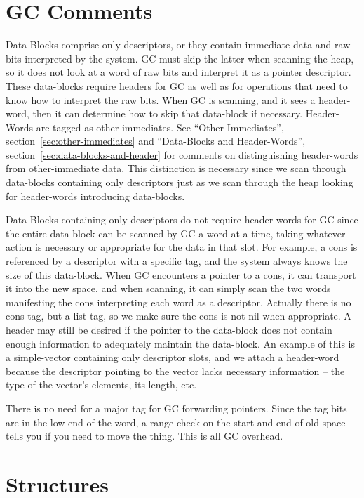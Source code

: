 
\section{GC Comments}

Data-Blocks comprise only descriptors, or they contain immediate data and raw
bits interpreted by the system.  GC must skip the latter when scanning the
heap, so it does not look at a word of raw bits and interpret it as a pointer
descriptor.  These data-blocks require headers for GC as well as for operations
that need to know how to interpret the raw bits.  When GC is scanning, and it
sees a header-word, then it can determine how to skip that data-block if
necessary.  Header-Words are tagged as other-immediates.  See 
``Other-Immediates'', section~\ref{sec:other-immediates} and
``Data-Blocks and Header-Words'', section~\ref{sec:data-blocks-and-header} for comments on
distinguishing header-words from other-immediate data.  This distinction is
necessary since we scan through data-blocks containing only descriptors just as
we scan through the heap looking for header-words introducing data-blocks.

Data-Blocks containing only descriptors do not require header-words for GC
since the entire data-block can be scanned by GC a word at a time, taking
whatever action is necessary or appropriate for the data in that slot.  For
example, a cons is referenced by a descriptor with a specific tag, and the
system always knows the size of this data-block.  When GC encounters a pointer
to a cons, it can transport it into the new space, and when scanning, it can
simply scan the two words manifesting the cons interpreting each word as a
descriptor.  Actually there is no cons tag, but a list tag, so we make sure the
cons is not nil when appropriate.  A header may still be desired if the pointer
to the data-block does not contain enough information to adequately maintain
the data-block.  An example of this is a simple-vector containing only
descriptor slots, and we attach a header-word because the descriptor pointing
to the vector lacks necessary information -- the type of the vector's elements,
its length, etc.

There is no need for a major tag for GC forwarding pointers.  Since the tag
bits are in the low end of the word, a range check on the start and end of old
space tells you if you need to move the thing.  This is all GC overhead.



\section{Structures}

